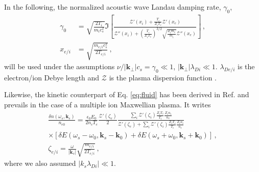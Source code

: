 \documentclass[
 reprint,
 superscriptaddress,
 amsmath,amssymb,
 aps,
]{revtex4-1}
\begin{document}
In the following, 
the normalized acoustic wave Landau damping rate, $\gamma_0$, 
\begin{align}
\gamma_0 &= \sqrt{\frac{2T_i }{m_ic_s^2 }} 
\Im\left[
\frac{  \mathcal{Z}'\left(x_i\right) 
+\frac{T_i}{Z_iT_e}  \mathcal{Z}'\left(x_e\right)   }{  \mathcal{Z}''\left(x_i\right) +\left(\frac{T_i}{Z_iT_e}\right)^{3/2}\sqrt{\frac{Z_im_e}{m_i}}  \mathcal{Z}''\left(x_e\right)    }
\right]\, , \nonumber \\
x_{e/i}&=\sqrt{\frac{m_{e/i}c_s^2}{2T_{e/i}}}\, ,\label{eq:g0}
\end{align}
will be used under the assumptions  $\nu/\vert \mathbf{k}_\perp \vert c_s= \gamma_0 \ll 1$, $\vert \mathbf{k}_\perp \vert\lambda_{Di}\ll 1$.
$\lambda_{De/i}$ is the electron/ion Debye length and $ \mathcal{Z}$ is the plasma dispersion function \cite{Fried_Gell-Mann_1960}.

Likewise, the kinetic counterpart of Eq. \eqref{eq:fluid} has been derived in Ref. \cite[]{POF_Drake_1973} and prevails in the case of a multiple ion Maxwellian plasma. It writes
\begin{align}
 \frac{ \delta n (\omega_s, \mathbf{k}_s ) }{n_{e0}}  =   \frac{ \epsilon_0  E_0 }{ 2n_c T_e } 
 \frac{\mathcal{Z}'( \zeta_e) }{2}
 \frac{\sum_i\mathcal{Z}'( \zeta_i)\frac{  Z_iT_e}{ T_i }\frac{  Z_in_i}{ n_e }   }{  \mathcal{Z}'( \zeta_e)+ \sum_i\mathcal{Z}'( \zeta_i)\frac{  Z_iT_e}{ T_i }\frac{ Z_i n_i}{ n_e }  }
\nonumber\\  \times \left[\delta E(\omega_s-\omega_0, \mathbf{k}_s-\mathbf{k}_0) +\delta E(\omega_s+\omega_0, \mathbf{k}_s+\mathbf{k}_0) \right] %
   \, ,\label{eq:drake}\\
   \zeta_{e/i} = \frac{   \omega }{   \vert\mathbf{k}_s\vert }  \sqrt{ \frac{ m_{e/i } }{ 2T_{e/i }}  }  \label{eq:xi} \, , 
 \end{align}
 where we also assumed $\vert k_s \lambda_{Di} \vert \ll 1$. 
\end{document}
